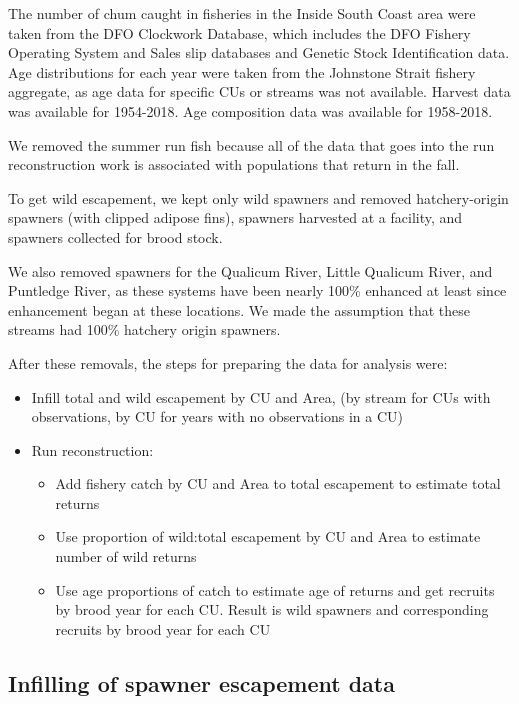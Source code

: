 \documentclass[11pt]{book}
\begin{document}
\hypertarget{fishery-harvest-genetics-and-age}{%
\label{fishery-harvest-genetics-and-age}}

The number of chum caught in fisheries in the Inside South Coast area were taken from the DFO Clockwork Database, which includes the DFO Fishery Operating System and Sales slip databases and Genetic Stock Identification data. Age distributions for each year were taken from the Johnstone Strait fishery aggregate, as age data for specific CUs or streams was not available. Harvest data was available for 1954-2018. Age composition data was available for 1958-2018.

\hypertarget{data-treatment}{%
\label{data-treatment}}

We removed the summer run fish because all of the data that goes into the run reconstruction work is associated with populations that return in the fall.

To get wild escapement, we kept only wild spawners and removed hatchery-origin spawners (with clipped adipose fins), spawners harvested at a facility, and spawners collected for brood stock.

We also removed spawners for the Qualicum River, Little Qualicum River, and Puntledge River, as these systems have been nearly 100\% enhanced at least since enhancement began at these locations. We made the assumption that these streams had 100\% hatchery origin spawners.

After these removals, the steps for preparing the data for analysis were:
\begin{itemize}

\item
  Infill total and wild escapement by CU and Area, (by stream for CUs with observations, by CU for years with no observations in a CU)
\item
  Run reconstruction:
  \begin{itemize}

  \item
    Add fishery catch by CU and Area to total escapement to estimate total returns
  \item
    Use proportion of wild:total escapement by CU and Area to estimate number of wild returns
  \item
    Use age proportions of catch to estimate age of returns and get recruits by brood year for each CU. Result is wild spawners and corresponding recruits by brood year for each CU
  \end{itemize}
\end{itemize}
\hypertarget{infilling-of-spawner-escapement-data}{%
\subsection{Infilling of spawner escapement data}\label{infilling-of-spawner-escapement-data}}
\end{document}
